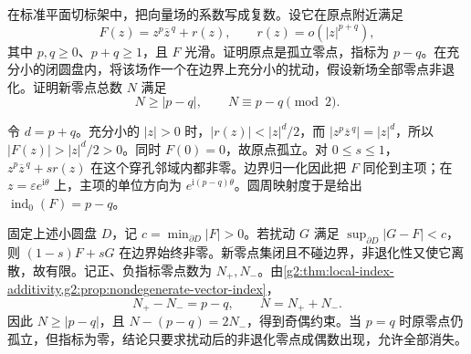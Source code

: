 \begin{exercise}\label{g2:ex:mixed-monomial-vector-index}
	在标准平面切标架中，把向量场的系数写成复数。设它在原点附近满足
	\[
		F(z)=z^p\overline z^{\,q}+r(z),\qquad r(z)=o(|z|^{p+q}),
	\]
	其中 \(p,q\ge0\)、\(p+q\ge1\)，且 \(F\) 光滑。证明原点是孤立零点，指标为 \(p-q\)。在充分小的闭圆盘内，将该场作一个在边界上充分小的扰动，假设新场全部零点非退化。证明新零点总数 \(N\) 满足
	\[
		N\ge|p-q|,\qquad N\equiv p-q\pmod2.
	\]
\end{exercise}
\begin{solution}
	令 \(d=p+q\)。充分小的 \(|z|>0\) 时，\(|r(z)|<|z|^d/2\)，而 \(|z^p\overline z^{\,q}|=|z|^d\)，所以 \(|F(z)|>|z|^d/2>0\)。同时 \(F(0)=0\)，故原点孤立。对 \(0\le s\le1\)，\(z^p\overline z^{\,q}+s r(z)\) 在这个穿孔邻域内都非零。边界归一化因此把 \(F\) 同伦到主项；在 \(z=\varepsilon e^{\mathrm i\theta}\) 上，主项的单位方向为 \(e^{\mathrm i(p-q)\theta}\)。圆周映射度于是给出 \(\operatorname{ind}_0(F)=p-q\)。

	固定上述小圆盘 \(D\)，记 \(c=\min_{\partial D}|F|>0\)。若扰动 \(G\) 满足 \(\sup_{\partial D}|G-F|<c\)，则 \((1-s)F+sG\) 在边界始终非零。新零点集闭且不碰边界，非退化性又使它离散，故有限。记正、负指标零点数为 \(N_+,N_-\)。由\cref{g2:thm:local-index-additivity,g2:prop:nondegenerate-vector-index}，
	\[
		N_+-N_-=p-q,\qquad N=N_++N_-.
	\]
	因此 \(N\ge|p-q|\)，且 \(N-(p-q)=2N_-\)，得到奇偶约束。当 \(p=q\) 时原零点仍孤立，但指标为零，结论只要求扰动后的非退化零点成偶数出现，允许全部消失。
\end{solution}

